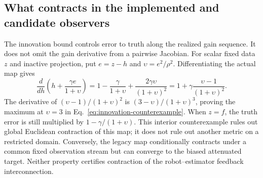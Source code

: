 \subsection{What contracts in the implemented and candidate observers}
\label{app:sampled-gradient}
The innovation bound controls error to truth along the realized gain
sequence. It does not omit the gain derivative from a pairwise Jacobian.
For scalar fixed data $z$ and inactive projection, put $e=z-h$ and
$\upsilon=e^2/\rho^2$. Differentiating the actual map gives
\[
\frac{d}{dh}\!\left(h+\frac{\gamma e}{1+\upsilon}\right)
=1-\frac{\gamma}{1+\upsilon}+\frac{2\gamma\upsilon}{(1+\upsilon)^2}
=1+\gamma\frac{\upsilon-1}{(1+\upsilon)^2}.
\]
The derivative of $(\upsilon-1)/(1+\upsilon)^2$ is $(3-\upsilon)/(1+\upsilon)^3$, proving the maximum
at $\upsilon=3$ in Eq.~\eqref{eq:innovation-counterexample}. When $z=f$, the
truth error is still multiplied by $1-\gamma/(1+\upsilon)$. This interior
counterexample rules out global Euclidean contraction of this map; it does
not rule out another metric on a restricted domain. Conversely, the legacy
map conditionally contracts under a common fixed observation stream but can
converge to the biased attenuated target. Neither property certifies
contraction of the robot--estimator feedback interconnection.

